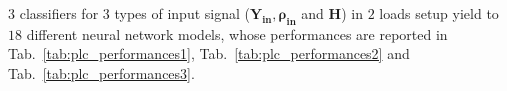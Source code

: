 $3$ classifiers for $3$ types of input signal ($\mathbf{Y_{\text{in}}}, \mathbf{\rho_{\text{in}}}$ and $\mathbf{H}$) in $2$ loads setup yield to $18$ different neural network models, whose performances are reported in Tab.~\ref{tab:plc_performances1}, Tab.~\ref{tab:plc_performances2} and Tab.~\ref{tab:plc_performances3}.

\begin{table}[b]
\begin{center}
\caption{Detection accuracy for $\mathbf{Y_{\text{in}}}$ with constant and variable load impedances.}
\label{tab:plc_performances1}
\end{center}
\end{table}

